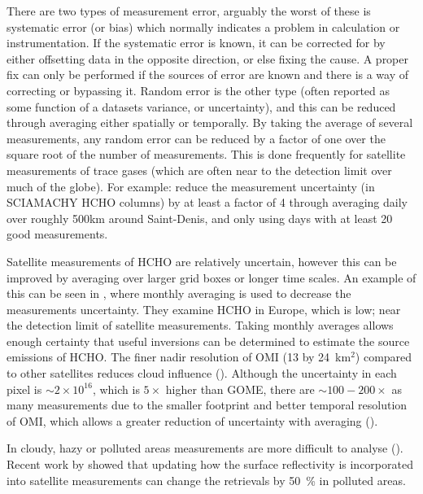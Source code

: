     There are two types of measurement error, arguably the worst of these is systematic error (or bias) which normally indicates a problem in calculation or instrumentation.
    If the systematic error is known, it can be corrected for by either offsetting data in the opposite direction, or else fixing the cause.
    A proper fix can only be performed if the sources of error are known and there is a way of correcting or bypassing it.
    Random error is the other type (often reported as some function of a datasets variance, or uncertainty), and this can be reduced through averaging either spatially or temporally. 
    By taking the average of several measurements, any random error can be reduced by a factor of one over the square root of the number of measurements.
    This is done frequently for satellite measurements of trace gases (which are often near to the detection limit over much of the globe).
    For example: \cite{Vigouroux2009} reduce the measurement uncertainty (in SCIAMACHY HCHO columns) by at least a factor of 4 through averaging daily over roughly 500km around Saint-Denis, and only using days with at least 20 good measurements.
    
    Satellite measurements of HCHO are relatively uncertain, however this can be improved by averaging over larger grid boxes or longer time scales.
    An example of this can be seen in \cite{Dufour2009}, where monthly averaging is used to decrease the measurements uncertainty.
    They examine HCHO in Europe, which is low; near the detection limit of satellite measurements.
    Taking monthly averages allows enough certainty that useful inversions can be determined to estimate the source emissions of HCHO.
    The finer nadir resolution of OMI (13 by 24~km${^2}$) compared to other satellites reduces cloud influence (\cite{Millet2006, Millet2008}). 
    Although the uncertainty in each pixel is $\sim 2 \times 10^{16}$, which is $5 \times$ higher than GOME, there are $\sim 100-200 \times $ as many measurements due to the smaller footprint and better temporal resolution of OMI, which allows a greater reduction of uncertainty with averaging (\cite{Chance2002,Millet2008}).
    
    In cloudy, hazy or polluted areas measurements are more difficult to analyse (\cite[e.g.][]{Palmer2003,Marais2014}).
    Recent work by \cite{Vasilkov2017} showed that updating how the surface reflectivity is incorporated into satellite measurements can change the retrievals by 50~\% in polluted areas.
    

